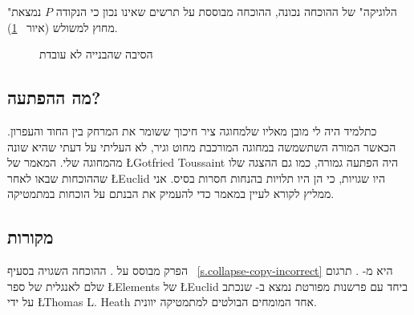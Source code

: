 "הלוגיקה" של ההוכחה נכונה, ההוכחה מבוססת על תרשים שאינו נכון כי הנקודה
$P$
נמצאת מחוץ למשולש (איור%
~\ref{f.isoceles-wrong}).
\begin{figure}[tb]
\begin{center}
\caption{הסיבה שהבנייה לא עובדת}\label{f.isoceles-wrong}
\end{center}
\end{figure}

\subsection*{מה ההפתעה?}

כתלמיד היה לי מובן מאליו שלמחוגה ציר חיכוך ששומר את המרחק בין החוד והעפרון. הכאשר המורה השתשמשה במחוגה המורכבת מחוט וגיר, לא העליתי על דעתי שהיא שונה מהמחוגה שלי. המאמר של
\L{Gotfried Toussaint}
היה הפתעה גמורה, כמו גם ההצגה שלו שההוכחות שבאו לאחר 
\L{Euclid}
היו שגויות, כי הן היו תלויות בהנחות חסרות בסיס. אני ממליץ לקורא לעיין במאמר כדי להעמיק את הבנתם על הוכחות במתמטיקה.

\subsection*{מקורות}

הפרק מבוסס על
\cite{toussaint}.
ההוכחה השגויה בסעיף%
~\ref{s.collapse-copy-incorrect}
היא מ-%
\cite{rusty}.
תרגום שלם לאנגלית של ספר
\L{Elements}
של 
\L{Euclid}
ביחד עם פרשנות מפורטת נמצא ב-%
\cite{euclid}
שנכתב על ידי
\L{Thomas L. Heath}
אחד המומחים הבולטים למתמטיקה יוונית.

